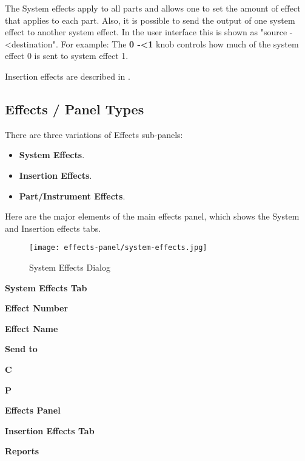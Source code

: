    The System effects apply to all parts and allows one to set the amount of
   effect that applies to each part. Also, it is possible to send the output
   of one system effect to another system effect. In the user interface this
   is shown as "source -\textless destination". For example:
   The \textbf{0 -\textless 1} knob controls how
   much of the system effect 0 is sent to system effect 1.

   Insertion effects are described in
   .

\subsection{Effects / Panel Types}
\label{subsec:effects_paneltypes}

   There are three variations of Effects sub-panels:

   \begin{itemize}
      \item \textbf{System Effects}.
      \item \textbf{Insertion Effects}.
      \item \textbf{Part/Instrument Effects}.
   \end{itemize}

   Here are the major elements of the main effects panel, which shows the
   System and Insertion effects tabs.

\begin{figure}[H]
   \centering
   \texttt{[image: effects-panel/system-effects.jpg]}
   \caption{System Effects Dialog}
   \label{fig:system_effects_dialog}
\end{figure}

   \begin{enumber}
      \item \textbf{System Effects Tab}
      \item \textbf{Effect Number}
      \item \textbf{Effect Name}
      \item \textbf{Send to}
      \item \textbf{C}
      \item \textbf{P}
      \item \textbf{Effects Panel}
      \item \textbf{Insertion Effects Tab}
      \item \textbf{Reports}
   \end{enumber}

